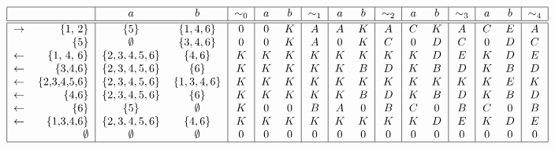 \documentclass[11pt]{article}
\begin{document}
\[
\begin{tabular}{|r r|c c|c|c c|c|c c|c|c c|c|c c|c|}
    \hline
    && $a$ & $b$ & $\sim_0$ & $a$ & $b$ & $\sim_1$ & $a$ & $b$ & $\sim_2$ & $a$ & $b$ & $\sim_3$ & $a$ & $b$ & $\sim_4$\\
    \hline
    \hline
    $\rightarrow$& $\{$1, 2$\}$     & $\{5\}$        & $\{1,4,6\}$    & $0$ & $0$ & $K$ & $A$ & $A$ & $K$ & $A$ & $C$ & $K$ & $A$ & $C$ & $E$ & $A$\\
                 &$\{$5$\}$         & $\emptyset$& $\{3,4,6\}$    & $0$ & $0$ & $K$ & $A$ & $0$ & $K$ & $C$ & $0$ & $D$ & $C$ & $0$ & $D$ & $C$\\
    $\leftarrow$& $ \{$1, 4, 6$\}$  & $\{2,3,4,5,6\}$& $\{4,6\}$      & $K$ & $K$ & $K$ & $K$ & $K$ & $K$ & $K$ & $K$ & $D$ & $E$ & $K$ & $D$ & $E$\\
    $\leftarrow$& $ \{$3,4,6$\}$    & $\{2,3,4,5,6\}$& $\{6\}$        & $K$ & $K$ & $K$ & $K$ & $K$ & $B$ & $D$ & $K$ & $B$ & $D$ & $K$ & $B$ & $D$\\
    $\leftarrow$& $ \{$2,3,4,5,6$\}$& $\{2,3,4,5,6\}$& $\{1,3,4,6\}$  & $K$ & $K$ & $K$ & $K$ & $K$ & $K$ & $K$ & $K$ & $K$ & $K$ & $K$ & $E$ & $K$\\
    $\leftarrow$& $ \{$4,6$\}$      & $\{2,3,4,5,6\}$& $\{6\}$        & $K$ & $K$ & $K$ & $K$ & $K$ & $B$ & $D$ & $K$ & $B$ & $D$ & $K$ & $B$ & $D$\\
    $\leftarrow$& $ \{$6$\}$        & $\{5\}$        & $\emptyset$& $K$ & $0$ & $0$ & $B$ & $A$ & $0$ & $B$ & $C$ & $0$ & $B$ & $C$ & $0$ & $B$\\
    $\leftarrow$& $\{$1,3,4,6$\}$   & $\{2,3,4,5,6\}$& $\{4,6\}$      & $K$ & $K$ & $K$ & $K$ & $K$ & $K$ & $K$ & $K$ & $D$ & $E$ & $K$ & $D$ & $E$\\
                &$\emptyset$        &$\emptyset$     &$\emptyset$     & $0$ & $0$ & $0$ & $0$ & $0$ & $0$ & $0$ & $0$ & $0$ & $0$ & $0$ & $0$ & $0$\\ 
    \hline
\end{tabular}
\]


 
\end{document}
